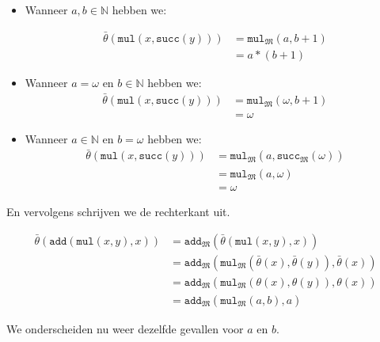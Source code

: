 \documentclass[a4paper,11pt]{article}
\begin{document}
\begin{itemize}
\begin{itemize}
\item
Wanneer $a,b \in \mathbb{N}$ hebben we:

\begin{align*}
\bar \theta(\texttt{mul}(x,\texttt{succ}(y))) &= \texttt{mul}_{\mathfrak{M}}(a, b+1) \\
                                              &= a*(b+1)
\end{align*}

\item
Wanneer $a = \omega$ en $b \in \mathbb{N}$ hebben we:
\begin{align*}
\bar \theta(\texttt{mul}(x,\texttt{succ}(y))) &= \texttt{mul}_{\mathfrak{M}}(\omega, b+1) \\
                                              &= \omega
\end{align*}

\item
Wanneer $a \in \mathbb{N}$ en $b = \omega$ hebben we:
\begin{align*}
\bar \theta(\texttt{mul}(x,\texttt{succ}(y))) &= \texttt{mul}_{\mathfrak{M}}(a, \texttt{succ}_{\mathfrak{M}}(\omega)) \\
                                              &= \texttt{mul}_{\mathfrak{M}}(a, \omega) \\
                                              &= \omega
\end{align*}

\end{itemize}

En vervolgens schrijven we de rechterkant uit.

\begin{align*}
\bar \theta(\texttt{add}(\texttt{mul}(x,y),x)) &= \texttt{add}_{\mathfrak{M}}(\bar \theta(\texttt{mul}(x,y),x)) \\
                                               &= \texttt{add}_{\mathfrak{M}}(\texttt{mul}_{\mathfrak{M}}(\bar \theta(x),\bar \theta(y)),\bar \theta(x)) \\
                                               &= \texttt{add}_{\mathfrak{M}}(\texttt{mul}_{\mathfrak{M}}(\theta(x),\theta(y)),\theta(x)) \\
                                               &= \texttt{add}_{\mathfrak{M}}(\texttt{mul}_{\mathfrak{M}}(a,b),a)
\end{align*}

We onderscheiden nu weer dezelfde gevallen voor $a$ en $b$.

\begin{itemize}


\end{itemize}
\end{itemize}
\end{document}
